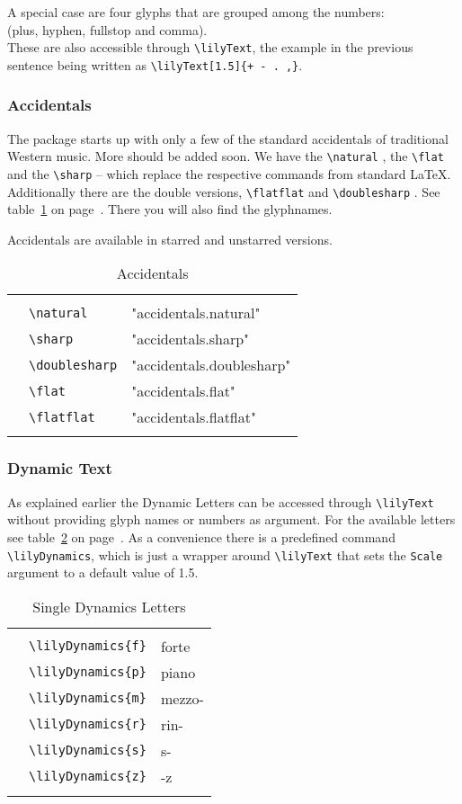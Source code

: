 \documentclass{article}
\newcommand*{\cmd}[1]{\texttt{\textbackslash #1}}
\newcommand{\tmpCaption}{} %
\newcommand{\tmpLabel}{}
\newenvironment{reftable}[2]
	{%
		\renewcommand{\tmpCaption}{#1}
		\renewcommand{\tmpLabel}{#2}
		\begin{table}[ht]
		\begin{center}
		\begin{tabular}[t]{lll}
		\hline
		&\\
	}
	{%
		&\\
		\hline
		\end{tabular}
		\caption{\tmpCaption}
		\label{table:\tmpLabel}
		\end{center}
		\end{table}
	}
\begin{document}
A special case are four glyphs that are grouped among the numbers:\\
 (plus, hyphen, fullstop and comma). \\
These are also accessible through \cmd{lilyText}, the example in the previous sentence being written as \cmd{lilyText[1.5]\{+~-~.~,\}}.

\subsubsection{Accidentals}
The package starts up with only a few of the standard accidentals of traditional Western music. 
More should be added soon. 
We have the \cmd{natural} \natural, the \cmd{flat} \flat* and the \cmd{sharp} \sharp* -- which replace the respective commands from standard \LaTeX. 
Additionally there are the double versions, \cmd{flatflat} \flatflat* and \cmd{doublesharp} \doublesharp. See table~\ref{table:accidentals} on page~\pageref{table:accidentals}. 
There you will also find the glyphnames.

Accidentals are available in starred and unstarred versions.

\begin{reftable}{Accidentals}{accidentals}
\natural & \cmd{natural} & "accidentals.natural"\\
\sharp & \cmd{sharp} & "accidentals.sharp"\\
\doublesharp & \cmd{doublesharp} & "accidentals.doublesharp"\\
\flat & \cmd{flat} & "accidentals.flat"\\
\flatflat & \cmd{flatflat} & "accidentals.flatflat"\\
\end{reftable}



\subsubsection{Dynamic Text}
As explained earlier the Dynamic Letters can be accessed through \cmd{lilyText} without providing glyph names or numbers as argument. 
For the available letters see table~\ref{table:singleDynLetters} on page~\pageref{table:singleDynLetters}. 
As a convenience there is a predefined command \cmd{lilyDynamics}, which is just a wrapper around \cmd{lilyText} that sets the \texttt{Scale} argument to a default value of 1.5.

\begin{reftable}{Single Dynamics Letters}{singleDynLetters}
\lilyDynamics{f} & \cmd{lilyDynamics\{f\}} & forte\\
\lilyDynamics{p} & \cmd{lilyDynamics\{p\}} & piano\\
\lilyDynamics{m} & \cmd{lilyDynamics\{m\}} & mezzo-\\
\lilyDynamics{r} & \cmd{lilyDynamics\{r\}} & rin-\\
\lilyDynamics{s} & \cmd{lilyDynamics\{s\}} & s-\\
\lilyDynamics{z} & \cmd{lilyDynamics\{z\}} & -z\\
\end{reftable}
\end{document}
